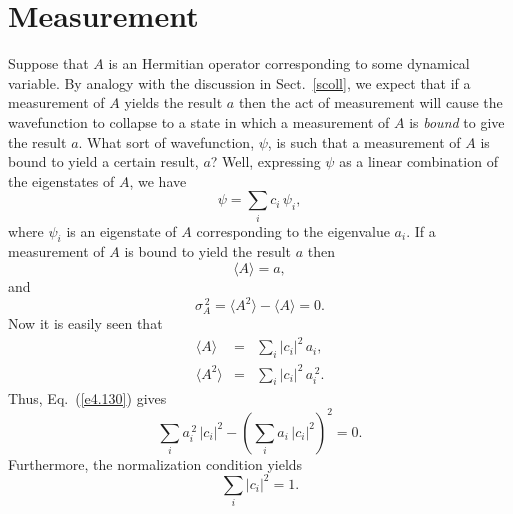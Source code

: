 \section{Measurement}\label{smeas}
Suppose that $A$ is an Hermitian operator corresponding to some dynamical
variable. By analogy with the discussion  in Sect.~\ref{scoll},  we expect that if a measurement of $A$
yields the result $a$  then the act of measurement will cause the wavefunction to collapse to a state in which a measurement
of $A$ is {\em bound}\/ to give the result $a$. 
What sort of wavefunction, $\psi$, is such that a measurement of $A$ is
bound to yield a certain result, $a$? Well, expressing $\psi$ as
a linear combination of the eigenstates of $A$, we have
\begin{equation}\label{e4.128}
\psi = \sum_i c_i\,\psi_i,
\end{equation}
where $\psi_i$ is an eigenstate of $A$ corresponding to the eigenvalue $a_i$. If a measurement of $A$ is bound to yield the result $a$ then
\begin{equation}
\langle A\rangle= a,
\end{equation}
and
\begin{equation}\label{e4.130}
\sigma_A^{\,2} = \langle A^2\rangle - \langle A\rangle = 0.
\end{equation}
Now it is easily seen that
\begin{eqnarray}\label{e4.131}
\langle A\rangle &=& \sum_i |c_i|^2\,a_i,\\[0.5ex]
\langle A^2\rangle &=& \sum_i |c_i|^2\,a_i^{\,2}.
\end{eqnarray}
Thus, Eq.~(\ref{e4.130}) gives
\begin{equation}
 \sum_i a_i^{\,2}\,|c_i|^2 - \left(\sum_i a_i\,|c_i|^2\right)^2=0.
\end{equation}
Furthermore, the normalization condition yields
\begin{equation}\label{e4.134}
\sum_i |c_i|^2 = 1.
\end{equation}

